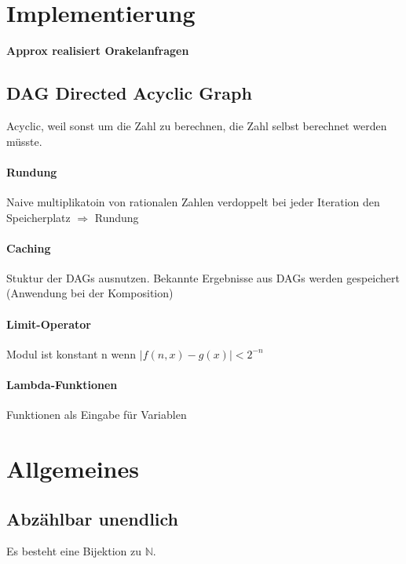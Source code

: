 \documentclass[ngerman]{scrartcl}
\begin{document}
%
%

\section{Implementierung}
\textbf{Approx realisiert Orakelanfragen}

\subsection{DAG Directed Acyclic Graph}
Acyclic, weil sonst um die Zahl zu berechnen, die Zahl selbst berechnet werden müsste.

\paragraph{Rundung} Naive multiplikatoin von rationalen Zahlen verdoppelt bei jeder Iteration den Speicherplatz $ \Rightarrow $ Rundung

\paragraph{Caching} Stuktur der DAGs ausnutzen. Bekannte Ergebnisse aus DAGs werden gespeichert (Anwendung bei der Komposition)

\paragraph{Limit-Operator} Modul ist konstant n wenn $ |f(n,x) - g(x)| < 2^{-n} $

\paragraph{Lambda-Funktionen} Funktionen als Eingabe für Variablen

%
%
\section{Allgemeines}

\subsection{Abzählbar unendlich}
Es besteht eine Bijektion zu $ \mathbb{N} $.
\end{document}
